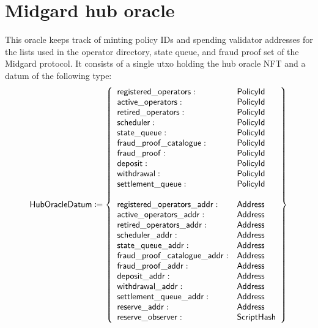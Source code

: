 \documentclass[../midgard.tex]{subfiles}
\begin{document}
\section{Midgard hub oracle}
\label{h:midgard-hub-oracle}

This oracle keeps track of minting policy IDs and spending validator addresses for the lists used in the operator directory, state queue, and fraud proof set of the Midgard protocol.
It consists of a single utxo holding the hub oracle NFT and a datum of the following type:
\begin{equation*}
    \mathsf{HubOracleDatum} \coloneq \left\{
    \begin{array}{ll}
        \mathsf{registered\_operators} : & \mathsf{PolicyId} \\
        \mathsf{active\_operators} : & \mathsf{PolicyId} \\
        \mathsf{retired\_operators} : & \mathsf{PolicyId} \\
        \mathsf{scheduler} : & \mathsf{PolicyId} \\
        \mathsf{state\_queue} : & \mathsf{PolicyId} \\
        \mathsf{fraud\_proof\_catalogue} : & \mathsf{PolicyId} \\
        \mathsf{fraud\_proof} : & \mathsf{PolicyId} \\
        \mathsf{deposit} : & \mathsf{PolicyId} \\
        \mathsf{withdrawal} : & \mathsf{PolicyId} \\
        \mathsf{settlement\_queue} : & \mathsf{PolicyId} \\
        \\
        \mathsf{registered\_operators\_addr} : & \mathsf{Address} \\
        \mathsf{active\_operators\_addr} : & \mathsf{Address} \\
        \mathsf{retired\_operators\_addr} : & \mathsf{Address} \\
        \mathsf{scheduler\_addr} : & \mathsf{Address} \\
        \mathsf{state\_queue\_addr} : & \mathsf{Address} \\
        \mathsf{fraud\_proof\_catalogue\_addr} : & \mathsf{Address} \\
        \mathsf{fraud\_proof\_addr} : & \mathsf{Address} \\
        \mathsf{deposit\_addr} : & \mathsf{Address} \\
        \mathsf{withdrawal\_addr} : & \mathsf{Address} \\
        \mathsf{settlement\_queue\_addr} : & \mathsf{Address} \\
        \mathsf{reserve\_addr} : & \mathsf{Address} \\ 
        \mathsf{reserve\_observer} : & \mathsf{ScriptHash}
    \end{array} \right\}
\end{equation*}
\end{document}
